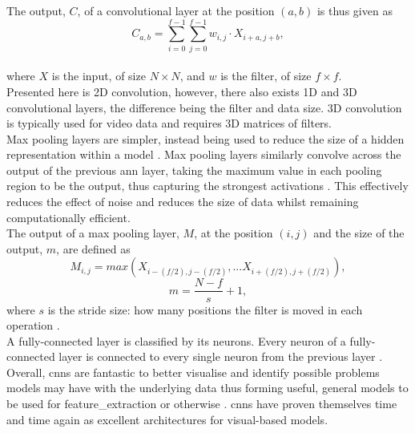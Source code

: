 The output, $C$, of a convolutional layer at the position $(a,b)$ is thus given as
\[C_{a,b} = \sum^{f-1}_{i=0}\sum^{f-1}_{j=0}w_{i,j} \cdot X_{i+a,j+b},\]\\
where $X$ is the input, of size $N\times N$, and $w$ is the filter, of size $f\times f$.\\
Presented here is 2D convolution, however, there also exists 1D and 3D convolutional layers, the difference being the filter and data size. 3D convolution is typically used for video data and requires 3D matrices of filters.\\ 
Max pooling layers are simpler, instead being used to reduce the size of a hidden representation within a model \cite{cnn_intro}. Max pooling layers similarly convolve across the output of the previous \acrshort{ann} layer, taking the maximum value in each pooling region to be the output, thus capturing the strongest activations \cite{max_pooling_&_dropout}. This effectively reduces the effect of noise and reduces the size of data whilst remaining computationally efficient.\\
The output of a max pooling layer, $M$, at the position $(i,j)$ and the size of the output, $m$, are defined as
\[M_{i,j} = max(X_{i-(f/2),j-(f/2)},...X_{i+(f/2),j+(f/2)}),\]
\[m = \frac{N - f}{s} + 1,\]
where $s$ is the stride size: how many positions the filter is moved in each operation \cite{Pooling-methods-in-deep-neural-networks}.\\
A fully-connected layer is classified by its neurons. Every neuron of a fully-connected layer is connected to every single neuron from the previous layer \cite{cnn_intro}.\\
Overall, \acrshort{cnn}s are fantastic to better visualise and identify possible problems models may have with the underlying data thus forming useful, general models to be used for \gls{feature_extraction} or otherwise \cite{Visualizing-and-understanding-convolutional-networks}. \acrshort{cnn}s have proven themselves time and time again as excellent architectures for visual-based models.
